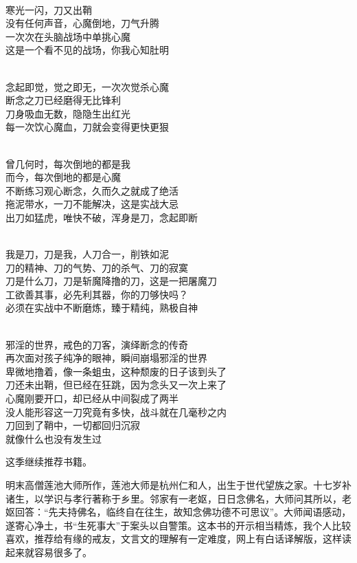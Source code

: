 \begin{poem}[戒色刀客]
    \begin{multicols}{2}
        \begin{center}~\\
            寒光一闪，刀又出鞘 \\ 没有任何声音，心魔倒地，刀气升腾 \\ 一次次在头脑战场中单挑心魔 \\ 这是一个看不见的战场，你我心知肚明

            ~\\

            念起即觉，觉之即无，一次次觉杀心魔 \\ 断念之刀已经磨得无比锋利 \\ 刀身吸血无数，隐隐生出红光 \\ 每一次饮心魔血，刀就会变得更快更狠

            ~\\

            曾几何时，每次倒地的都是我 \\ 而今，每次倒地的都是心魔 \\ 不断练习观心断念，久而久之就成了绝活 \\ 拖泥带水，一刀不能解决，这是实战大忌 \\ 出刀如猛虎，唯快不破，浑身是刀，念起即断

            ~\\

            我是刀，刀是我，人刀合一，削铁如泥 \\ 刀的精神、刀的气势、刀的杀气、刀的寂寞 \\ 刀是什么刀，刀是斩魔降撸的刀，这是一把屠魔刀 \\ 工欲善其事，必先利其器，你的刀够快吗？ \\ 必须在实战中不断磨炼，臻于精纯，熟极自神

            ~\\

            邪淫的世界，戒色的刀客，演绎断念的传奇 \\ 再次面对孩子纯净的眼神，瞬间崩塌邪淫的世界 \\ 卑微地撸着，像一条蛆虫，这种颓废的日子该到头了 \\ 刀还未出鞘，但已经在狂跳，因为念头又一次上来了 \\ 心魔刚要开口，却已经从中间裂成了两半 \\ 没人能形容这一刀究竟有多快，战斗就在几毫秒之内 \\ 刀回到了鞘中，一切都回归沉寂 \\ 就像什么也没有发生过
        \end{center}
    \end{multicols}
\end{poem}

这季继续推荐书籍。

\begin{book}[《竹窗随笔》]
    明末高僧莲池大师所作，莲池大师是杭州仁和人，出生于世代望族之家。十七岁补诸生，以学识与孝行著称于乡里。邻家有一老妪，日日念佛名，大师问其所以，老妪回答：“先夫持佛名，临终自在往生，故知念佛功德不可思议”。大师闻语感动，遂寄心净土，书“生死事大”于案头以自警策。这本书的开示相当精炼，我个人比较喜欢，推荐给有缘的戒友，文言文的理解有一定难度，网上有白话译解版，这样读起来就容易很多了。
\end{book}
